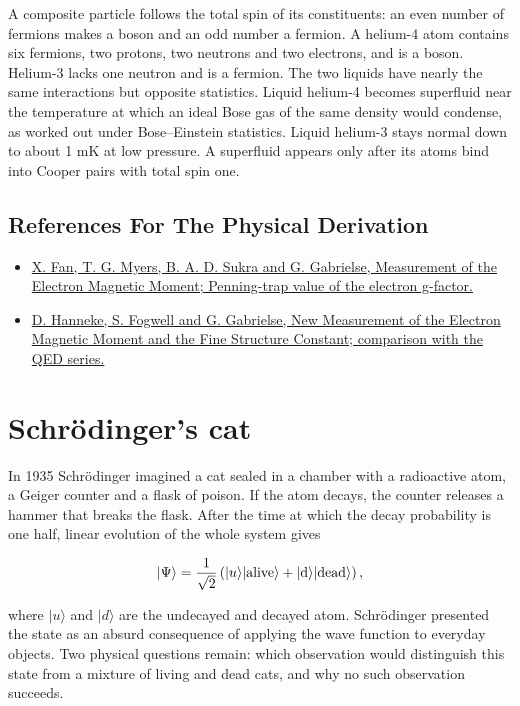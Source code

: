 \documentclass[11pt,oneside]{book}
\newenvironment{centeredalign}{\[\begin{gathered}[c]}{\end{gathered}\]}
\newcommand{\ket}[1]{\lvert #1\rangle}
\begin{document}
A composite particle follows the total spin of its constituents: an even number of fermions makes a boson and an odd number a fermion. A helium-4 atom contains six fermions, two protons, two neutrons and two electrons, and is a boson. Helium-3 lacks one neutron and is a fermion. The two liquids have nearly the same interactions but opposite statistics. Liquid helium-4 becomes superfluid near the temperature at which an ideal Bose gas of the same density would condense, as worked out under Bose--Einstein statistics. Liquid helium-3 stays normal down to about 1 mK at low pressure. A superfluid appears only after its atoms bind into Cooper pairs with total spin one.

\subsection*{References For The Physical Derivation}
\begin{itemize}
\item \href{https://arxiv.org/abs/2209.13084}{X. Fan, T. G. Myers, B. A. D. Sukra and G. Gabrielse, Measurement of the Electron Magnetic Moment; Penning-trap value of the electron g-factor.}
\item \href{https://arxiv.org/abs/0801.1134}{D. Hanneke, S. Fogwell and G. Gabrielse, New Measurement of the Electron Magnetic Moment and the Fine Structure Constant; comparison with the QED series.}
\end{itemize}





\clearpage

\section{Schrödinger's cat}

\label{topic:schr-dinger-s-cat}

In 1935 Schrödinger imagined a cat sealed in a chamber with a radioactive atom, a Geiger counter and a flask of poison. If the atom decays, the counter releases a hammer that breaks the flask. After the time at which the decay probability is one half, linear evolution of the whole system gives

\begin{centeredalign}
\ket\Psi=\frac{1}{\sqrt2}\left(\ket{u}\ket{\rm alive}+\ket{d}\ket{\rm dead}\right),
\end{centeredalign}

where \(\ket u\) and \(\ket d\) are the undecayed and decayed atom. Schrödinger presented the state as an absurd consequence of applying the wave function to everyday objects. Two physical questions remain: which observation would distinguish this state from a mixture of living and dead cats, and why no such observation succeeds.
\end{document}
